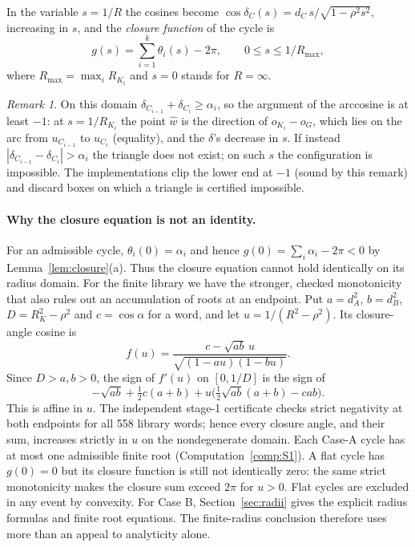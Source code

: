\documentclass[11pt]{article}
\theoremstyle{definition}
\theoremstyle{remark}
\newtheorem{remark}[theorem]{Remark}
\begin{document}
In the variable $s=1/R$ the cosines become
$\cos\delta_C(s)=d_C\,s/\sqrt{1-\rho^2s^2}$, increasing in $s$, and the
\emph{closure function} of the cycle is
\[
g(s)=\sum_{i=1}^k\theta_i(s)-2\pi,\qquad 0\le s\le 1/R_{\max},
\]
where $R_{\max}=\max_iR_{K_i}$ and $s=0$ stands for $R=\infty$.
\setcounter{theorem}{6}
\begin{remark}\label{rem:clip}
On this domain $\delta_{C_{i-1}}+\delta_{C_i}\ge\alpha_i$, so the argument
of the arccosine is at least $-1$: at $s=1/R_{K_i}$ the point $\hat w$ is
the direction of $o_{K_i}-o_G$, which lies on the arc from $u_{C_{i-1}}$
to $u_{C_i}$ (equality), and the $\delta$'s decrease in $s$. If instead
$|\delta_{C_{i-1}}-\delta_{C_i}|>\alpha_i$ the triangle does not exist; on
such $s$ the configuration is impossible. The implementations clip the
lower end at $-1$ (sound by this remark) and discard boxes on which a
triangle is certified impossible.
\end{remark}


\paragraph{Why the closure equation is not an identity.}
For an admissible cycle, $\theta_i(0)=\alpha_i$ and hence
$g(0)=\sum_i\alpha_i-2\pi<0$ by Lemma~\ref{lem:closure}(a).
Thus the closure equation cannot hold identically on its radius domain.
For the finite library we have the stronger, checked monotonicity that
also rules out an accumulation of roots at an endpoint. Put
$a=d_A^2$, $b=d_B^2$, $D=R_K^2-\rho^2$ and $c=\cos\alpha$ for a word,
and let $u=1/(R^2-\rho^2)$. Its closure-angle cosine is
\[
 f(u)=\frac{c-\sqrt{ab}\,u}{\sqrt{(1-au)(1-bu)}}.
\]
Since $D>a,b>0$, the sign of $f'(u)$ on $[0,1/D]$ is the sign of
\[
 -\sqrt{ab}+\tfrac12c(a+b)
 +u\bigl(\tfrac12\sqrt{ab}(a+b)-cab\bigr).
\]
This is affine in $u$. The independent stage-1 certificate checks strict
negativity at both endpoints for all 558 library words; hence every
closure angle, and their sum, increases strictly in $u$ on the
nondegenerate domain. Each Case-A cycle has at most one admissible finite
root (Computation~\ref{comp:S1}). A flat cycle has $g(0)=0$ but its
closure function is still not identically zero: the same strict
monotonicity makes the closure sum exceed $2\pi$ for $u>0$. Flat cycles are excluded in any
event by convexity. For Case B, Section~\ref{sec:radii} gives the explicit
radius formulas and finite root equations. The finite-radius conclusion
therefore uses more than an appeal to analyticity alone.
\end{document}
